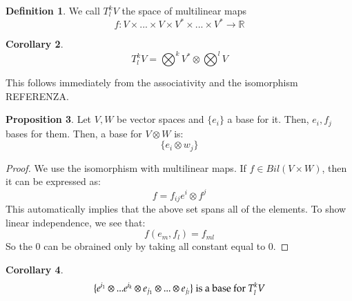 \documentclass[12pt,a4paper]{report}
\theoremstyle{definition}
\newtheorem{Def}{Definition}[chapter]
\theoremstyle{Theorem}
\newtheorem{Prop}[Def]{Proposition}
\theoremstyle{break}
\theoremstyle{definition}
\newtheorem{Cor}[Def]{Corollary}
\begin{document}
	\begin{Def}\label{def_1.1.3}
		We call $T^k_lV$ the space of multilinear maps 
		$$f:V\times...\times V\times V^*\times...\times V^*\rightarrow\mathbb{R}$$
	\end{Def}
	\begin{Cor}\label{cor_1.1.1}
		$$T^k_lV=\bigotimes^k V^*\otimes \bigotimes^l V$$
	\end{Cor}
	This follows immediately from the associativity and the isomorphism REFERENZA.
	\begin{Prop}\label{prop_1.1.4}
		Let $V,W$ be vector spaces and $\{e_i\}$ a base for it. Then, $e_i,f_j$ bases for them. Then, a base for $V\otimes W$ is:
		$$\big\{e_i\otimes w_j\big\}$$
	\end{Prop}
	\begin{proof}
		We use the isomorphism with multilinear maps. If $f\in Bil(V\times W)$, then it can be expressed as:
		$$f=f_{ij} e^i\otimes f^j$$
		This automatically implies that the above set spans all of the elements. To show linear independence, we see that:
		$$f(e_m,f_l)=f_{ml}$$
		So the 0 can be obrained only by taking all constant equal to 0.
	\end{proof}
	\begin{Cor}\label{cor_1.1.2}
		$$\{e^{i_1}\otimes...e^{i_k}\otimes e_{j_1}\otimes...\otimes e_{j_l}\}\hbox{ is a base for }T^k_lV$$
	\end{Cor}
\end{document}
